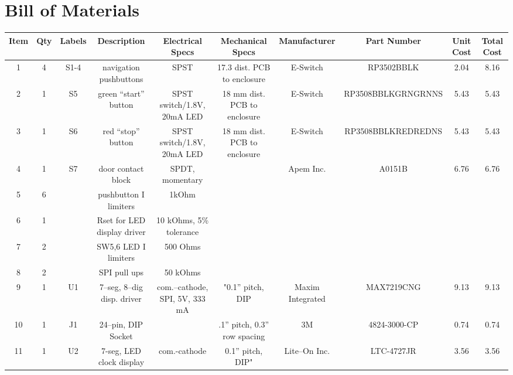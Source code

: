 \documentclass[10pt, twocolumn]{article}
\begin{document}
\pagebreak
\section{Bill of Materials}

\begin{center}
\begin{adjustbox}{max width=\textwidth}
\begin{tabular}{c c c c c c c c c c}
\hline\hline
Item	&Qty	&Labels	&Description		&Electrical Specs		&Mechanical Specs
	&Manufacturer		&Part Number		&Unit Cost	&Total Cost	\\
\hline
1	&4	&S1-4	&navigation pushbuttons	&SPST				&17.3 dist. PCB to enclosure
	&E-Switch		&RP3502BBLK		&2.04		&8.16	\\

2	&1	&S5	&green “start” button	&SPST switch/1.8V, 20mA LED	&18 mm dist. PCB to enclosure
	&E-Switch		&RP3508BBLKGRNGRNNS	&5.43		&5.43	\\

3	&1	&S6	&red “stop” button	&SPST switch/1.8V, 20mA LED	&18 mm dist. PCB to enclosure
	&E-Switch		&RP3508BBLKREDREDNS	&5.43		&5.43	\\

4	&1	&S7	&door contact block	&SPDT, momentary		&
	&Apem Inc.		&A0151B			&6.76		&6.76	\\

5	&6	&	&pushbutton I limiters	&1kOhm				&
	&		&			&		&	\\

6	&1	&	&Rset for LED display driver	&10 kOhms, 5\% tolerance	&
	&		&			&		&	\\

7	&2	&	&SW5,6 LED I limiters	&500 Ohms			&
	&		&			&		&	\\

8	&2	&	&SPI pull ups		&50 kOhms			&
	&		&			&		&	\\

9	&1	&U1	&7--seg, 8--dig disp. driver	&com.--cathode, SPI, 5V, 333 mA	&"0.1” pitch, DIP
	&Maxim Integrated	&MAX7219CNG		&9.13		&9.13	\\

10	&1	&J1	&24--pin, DIP Socket	&				&.1” pitch, 0.3” row spacing
	&3M		&4824-3000-CP			&0.74		&0.74	\\

11	&1	&U2	&7-seg, LED clock display	&com.-cathode	&0.1” pitch, DIP"
	&Lite--On Inc.		&LTC-4727JR		&3.56		&3.56	\\


\end{tabular}
\end{adjustbox}
\end{center}
\end{document}
